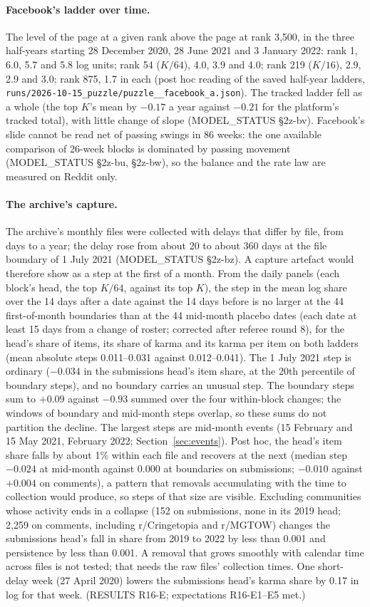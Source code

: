 \documentclass[10pt]{article}
\begin{document}
\paragraph{Facebook's ladder over time.} The level of the page at a given rank above the page at rank 3,500, in the three half-years starting 28 December 2020, 28 June 2021 and 3 January 2022: rank 1, 6.0, 5.7 and 5.8 log units; rank 54 ($K/64$), 4.0, 3.9 and 4.0; rank 219 ($K/16$), 2.9, 2.9 and 3.0; rank 875, 1.7 in each (post hoc reading of the saved half-year ladders, \texttt{runs/2026-10-15\_puzzle/puzzle\_\_facebook\_a.json}). The tracked ladder fell as a whole (the top $K$'s mean by $-0.17$ a year against $-0.21$ for the platform's tracked total), with little change of slope (MODEL\_STATUS \S2z-bv). Facebook's slide cannot be read net of passing swings in 86 weeks: the one available comparison of 26-week blocks is dominated by passing movement (MODEL\_STATUS \S2z-bu, \S2z-bw), so the balance and the rate law are measured on Reddit only.
\paragraph{The archive's capture.} The archive's monthly files were collected with delays that differ by file, from days to a year; the delay rose from about 20 to about 360 days at the file boundary of 1 July 2021 (MODEL\_STATUS \S2z-bz). A capture artefact would therefore show as a step at the first of a month. From the daily panels (each block's head, the top $K/64$, against its top $K$), the step in the mean log share over the 14 days after a date against the 14 days before is no larger at the 44 first-of-month boundaries than at the 44 mid-month placebo dates (each date at least 15 days from a change of roster; corrected after referee round 8), for the head's share of items, its share of karma and its karma per item on both ladders (mean absolute steps 0.011--0.031 against 0.012--0.041). The 1 July 2021 step is ordinary ($-0.034$ in the submissions head's item share, at the 20th percentile of boundary steps), and no boundary carries an unusual step. The boundary steps sum to $+0.09$ against $-0.93$ summed over the four within-block changes; the windows of boundary and mid-month steps overlap, so these sums do not partition the decline. The largest steps are mid-month events (15 February and 15 May 2021, February 2022; Section~\ref{sec:events}). Post hoc, the head's item share falls by about 1\% within each file and recovers at the next (median step $-0.024$ at mid-month against $0.000$ at boundaries on submissions; $-0.010$ against $+0.004$ on comments), a pattern that removals accumulating with the time to collection would produce, so steps of that size are visible. Excluding communities whose activity ends in a collapse (152 on submissions, none in its 2019 head; 2,259 on comments, including r/Cringetopia and r/MGTOW) changes the submissions head's fall in share from 2019 to 2022 by less than 0.001 and persistence by less than 0.001. A removal that grows smoothly with calendar time across files is not tested; that needs the raw files' collection times. One short-delay week (27 April 2020) lowers the submissions head's karma share by 0.17 in log for that week. (RESULTS R16-E; expectations R16-E1--E5 met.)
\end{document}
